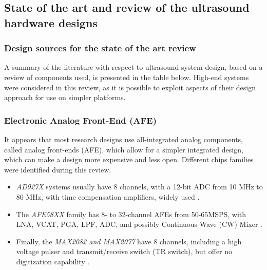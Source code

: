 \documentclass{article}
\begin{document}
\subsection{State of the art and review of the ultrasound hardware designs}

\subsubsection{Design sources for the state of the art review}

A summary of the literature with respect to ultrasound system design, based on a review of components used, is presented in the table below. High-end systems were considered in this review, as it is possible to exploit aspects of their design approach for use on simpler platforms. 



\subsubsection{Electronic Analog Front-End (AFE)}

It appears that most research designs use all-integrated analog components, called analog front-ends (AFE), which allow for a simpler integrated design, which can make a design more expensive and less open. Different chips families were identified during this review. 

\begin{itemize}
\item \emph{AD927X} systems usually have 8 channels, with a 12-bit ADC from 10 MHz to 80 MHz, with time compensation amplifiers, widely used \cite{di_ianni_system-level_2016,hewener_highly_2012,  raj_programmable_2018, cheung_multi-channel_2012, alqasemi_fpga-based_2012, batbayar_hardware_2018,  techavipoo_ultrasound_2012}. 
\item The \emph{AFE58XX} family has 8- to 32-channel AFEs from 50-65MSPS, with LNA, VCAT, PGA, LPF, ADC, and possibly Continuous Wave (CW) Mixer \cite{assef_flexible_2015, assef_design_2012, assef_compact_2014, assef_initial_2016, bharath_fpga-based_2015, bharath_novel_2016, lee_new_2014, hager_lightprobe:_2017, bharath_compact_2018, kidav_architecture_2019}.
\item Finally, the \emph{MAX2082 and MAX2077} have 8 channels, including a high voltage pulser and transmit/receive switch (TR switch), but offer no digitization capability \cite{hewener_mobile_2019, weng_fpga-based_2015}. 
\end{itemize}
\end{document}
